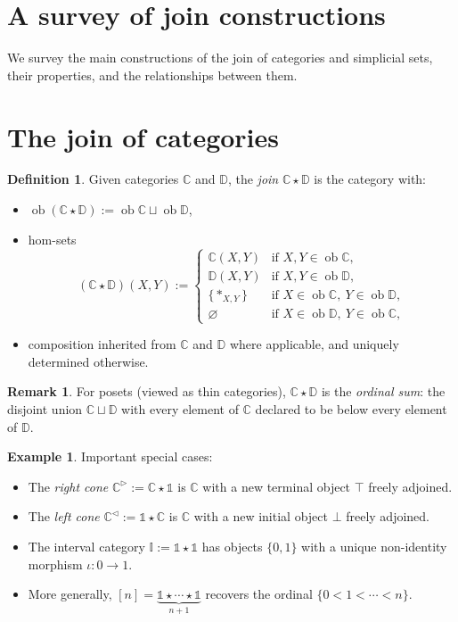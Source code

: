 \documentclass{article}
\theoremstyle{definition}
\newtheorem{definition}[proposition]{Definition}
\newtheorem{remark}[proposition]{Remark}
\newtheorem{example}[proposition]{Example}
\newcommand{\C}{\mathbb{C}}
\newcommand{\D}{\mathbb{D}}
\newcommand{\I}{\mathbb{I}}
\DeclareMathOperator{\ob}{ob}
\begin{document}
\section*{A survey of join constructions}

We survey the main constructions of the join of categories and simplicial sets, their properties, and the relationships between them.

\section{The join of categories}

\begin{definition}\label{join-cat}
	Given categories $\C$ and $\D$, the \emph{join} $\C \star \D$ is the category with:
	\begin{itemize}
		\item $\ob(\C \star \D) := \ob\C \sqcup \ob\D$,
		\item hom-sets
		\[(\C \star \D)(X,Y) := \begin{cases}
			\C(X,Y) & \text{if } X,Y \in \ob\C,\\
			\D(X,Y) & \text{if } X,Y \in \ob\D,\\
			\{*_{X,Y}\} & \text{if } X \in \ob\C,\ Y \in \ob\D,\\
			\varnothing & \text{if } X \in \ob\D,\ Y \in \ob\C,
		\end{cases}\]
		\item composition inherited from $\C$ and $\D$ where applicable, and uniquely determined otherwise.
	\end{itemize}
\end{definition}

\begin{remark}
	For posets (viewed as thin categories), $\C \star \D$ is the \emph{ordinal sum}: the disjoint union $\C \sqcup \D$ with every element of $\C$ declared to be below every element of $\D$.
\end{remark}

\begin{example}\label{cones-cat}
	Important special cases:
	\begin{itemize}
		\item The \emph{right cone} $\C^\triangleright := \C \star \mathbb{1}$ is $\C$ with a new terminal object $\top$ freely adjoined.
		\item The \emph{left cone} $\C^\triangleleft := \mathbb{1} \star \C$ is $\C$ with a new initial object $\bot$ freely adjoined.
		\item The interval category $\I := \mathbb{1} \star \mathbb{1}$ has objects $\{0,1\}$ with a unique non-identity morphism $\iota : 0 \to 1$.
		\item More generally, $[n] = \underbrace{\mathbb{1} \star \cdots \star \mathbb{1}}_{n+1}$ recovers the ordinal $\{0 < 1 < \cdots < n\}$.
	\end{itemize}
\end{example}
\end{document}
